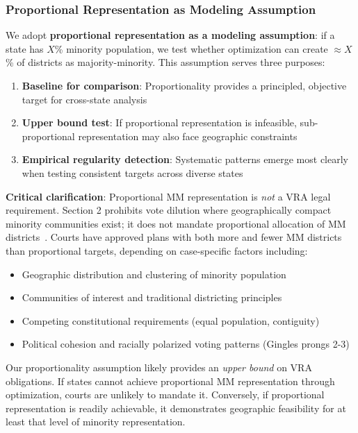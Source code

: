 \subsubsection{Proportional Representation as Modeling Assumption}

We adopt \textbf{proportional representation as a modeling assumption}: if a state has $X$\% minority population, we test whether optimization can create $\approx X$\% of districts as majority-minority. This assumption serves three purposes:

\begin{enumerate}
    \item \textbf{Baseline for comparison}: Proportionality provides a principled, objective target for cross-state analysis
    \item \textbf{Upper bound test}: If proportional representation is infeasible, sub-proportional representation may also face geographic constraints
    \item \textbf{Empirical regularity detection}: Systematic patterns emerge most clearly when testing consistent targets across diverse states
\end{enumerate}

\textbf{Critical clarification}: Proportional MM representation is \emph{not} a VRA legal requirement. Section 2 prohibits vote dilution where geographically compact minority communities exist; it does not mandate proportional allocation of MM districts~\citep{johnson1996}. Courts have approved plans with both more and fewer MM districts than proportional targets, depending on case-specific factors including:

\begin{itemize}
    \item Geographic distribution and clustering of minority population
    \item Communities of interest and traditional districting principles
    \item Competing constitutional requirements (equal population, contiguity)
    \item Political cohesion and racially polarized voting patterns (Gingles prongs 2-3)
\end{itemize}

Our proportionality assumption likely provides an \emph{upper bound} on VRA obligations. If states cannot achieve proportional MM representation through optimization, courts are unlikely to mandate it. Conversely, if proportional representation is readily achievable, it demonstrates geographic feasibility for at least that level of minority representation.

